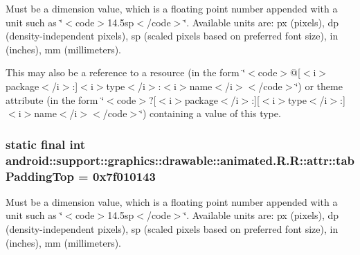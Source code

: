 Must be a dimension value, which is a floating point number appended with a unit such as \char`\"{}$<$code$>$14.5sp$<$/code$>$\char`\"{}. Available units are: px (pixels), dp (density-independent pixels), sp (scaled pixels based on preferred font size), in (inches), mm (millimeters). 

This may also be a reference to a resource (in the form \char`\"{}$<$code$>$@\mbox{[}$<$i$>$package$<$/i$>$:\mbox{]}$<$i$>$type$<$/i$>$:$<$i$>$name$<$/i$>$$<$/code$>$\char`\"{}) or theme attribute (in the form \char`\"{}$<$code$>$?\mbox{[}$<$i$>$package$<$/i$>$:\mbox{]}\mbox{[}$<$i$>$type$<$/i$>$:\mbox{]}$<$i$>$name$<$/i$>$$<$/code$>$\char`\"{}) containing a value of this type. \hypertarget{classandroid_1_1support_1_1graphics_1_1drawable_1_1animated_1_1_r_1_1attr_d5899653e0ef562ee432478ee632d65d}{
\subsubsection[{tabPaddingTop}]{\setlength{\rightskip}{0pt plus 5cm}static final int android::support::graphics::drawable::animated.R.R::attr::tabPaddingTop = 0x7f010143}}
\label{classandroid_1_1support_1_1graphics_1_1drawable_1_1animated_1_1_r_1_1attr_d5899653e0ef562ee432478ee632d65d}


Must be a dimension value, which is a floating point number appended with a unit such as \char`\"{}$<$code$>$14.5sp$<$/code$>$\char`\"{}. Available units are: px (pixels), dp (density-independent pixels), sp (scaled pixels based on preferred font size), in (inches), mm (millimeters). 

